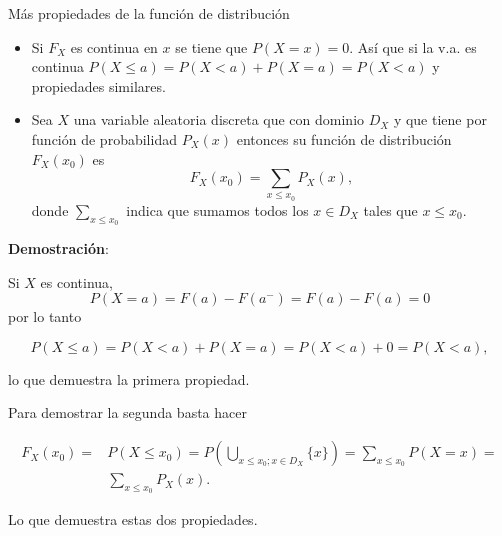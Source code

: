 \documentclass[
  letterpaper,
  DIV=11,
  numbers=noendperiod]{scrreprt}
\providecommand{\tightlist}{%
  \setlength{\itemsep}{0pt}\setlength{\parskip}{0pt}}\usepackage{longtable,booktabs,array}
\begin{document}
\begin{Definicion}{Más propiedades de la función de distribución}{}

\begin{itemize}
\tightlist
\item
  Si \(F_X\) es continua en \(x\) se tiene que \(P(X=x)=0\). Así que si
  la v.a. es continua \(P(X\leq a)=P(X< a)+P(X=a)=P(X<a)\) y propiedades
  similares.
\item
  Sea \(X\) una variable aleatoria discreta que con dominio \(D_X\) y
  que tiene por función de probabilidad \(P_{X}(x)\) entonces su función
  de distribución \(F_{X}(x_0)\) es
  \[F_{X}(x_0)=\sum_{x\leq x_0} P_{X}(x),\] donde
  \(\sum\limits_{x\leq x_0}\) indica que sumamos todos los \(x \in D_X\)
  tales que \(x\leq
  x_0.\)
\end{itemize}

\end{Definicion}

\textbf{Demostración}:

Si \(X\) es continua, \[P(X=a)=F(a)-F(a^{-})=F(a)-F(a)=0\] por lo tanto

\[P(X\leq a)=P(X<a)+P(X=a)= P(X<a)+0= P(X<a),\]

lo que demuestra la primera propiedad.

Para demostrar la segunda basta hacer

\begin{align*}
F_{X}(x_0)= &  P(X\leq x_0)=P\left(\bigcup_{x\leq
x_0; x\in D_X} \{x\}\right)= \sum_{x\leq x_0}P(X=x)=\\
&\sum_{x\leq x_0}P_{X}(x).
\end{align*}

Lo que demuestra estas dos propiedades.
\end{document}
